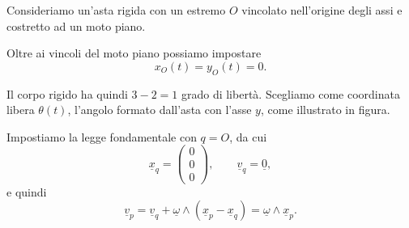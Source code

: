 \begin{examplebreak}{}
Consideriamo un'asta rigida con un estremo $O$ vincolato nell'origine degli assi e costretto ad un moto piano.

\begin{figure}
\end{figure}

Oltre ai vincoli del moto piano possiamo impostare
\[
x_O(t)=y_O(t)=0.
\]

Il corpo rigido ha quindi $3-2=1$ grado di libertà. Scegliamo come coordinata libera $\theta(t)$, l'angolo formato dall'asta con l'asse $y$, come illustrato in figura.

Impostiamo la legge fondamentale con $q=O$, da cui
\[
\underline{x}_q=
\begin{pmatrix}
0\\
0\\
0
\end{pmatrix},
\qquad
\underline{v}_q=\underline{0},
\]
e quindi
\[
\underline{v}_p=\underline{v}_q+\underline{\omega}\wedge(\underline{x}_p-\underline{x}_q)
=\underline{\omega}\wedge \underline{x}_p.
\]


\end{examplebreak}
